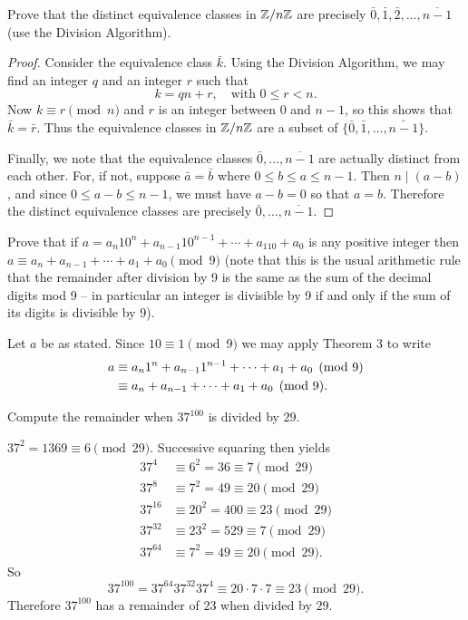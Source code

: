  Prove that the distinct equivalence classes in $\mathbb{Z}/n\mathbb{Z}$ are
precisely $\bar{0}, \bar{1}, \bar{2}, \ldots, \overline{n - 1}$ (use
the Division Algorithm).
\begin{proof}
  Consider the equivalence class $\bar k$. Using the Division
  Algorithm, we may find an integer $q$ and an integer $r$ such that
  \begin{equation*}
    k = qn + r,\quad\text{with $0\leq r<n$.}
  \end{equation*}
  Now $k\equiv r\pmod n$ and $r$ is an integer between $0$ and
  $n - 1$, so this shows that $\bar k = \bar r$. Thus the equivalence
  classes in $\mathbb{Z}/n\mathbb{Z}$ are a subset of
  $\{\bar{0}, \bar{1}, \ldots, \bar{n-1}\}$.

  Finally, we note that the equivalence classes
  $\bar0, \ldots, \overline{n-1}$ are actually distinct from each
  other. For, if not, suppose $\bar a = \bar b$ where
  $0\leq b\leq a\leq n-1$. Then $n\mid(a - b)$, and since
  $0\leq a-b\leq n-1$, we must have $a-b = 0$ so that $a =
  b$. Therefore the distinct equivalence classes are precisely
  $\bar0,\ldots,\overline{n-1}$.
\end{proof}

 Prove that if
$a = a_n10^n + a_{n-1}10^{n-1} + \cdots + a_110 + a_0$ is any positive
integer then $a\equiv a_n + a_{n-1} + \cdots + a_1 + a_0\pmod9$ (note
that this is the usual arithmetic rule that the remainder after
division by 9 is the same as the sum of the decimal digits mod 9 -- in
particular an integer is divisible by 9 if and only if the sum of its
digits is divisible by 9).
\begin{solution}
  Let $a$ be as stated. Since $10\equiv1\pmod9$ we may apply Theorem 3
  to write
  \begin{align*}
    a &\equiv a_n1^n + a_{n-1}1^{n-1} + \cdots + a_1 + a_0\pmod9 \\
      &\equiv a_n + a_{n-1} + \cdots + a_1 + a_0\pmod9. \qedhere
  \end{align*}
\end{solution}

 Compute the remainder when $37^{100}$ is divided by $29$.
\begin{solution}
  $37^2 = 1369\equiv6\pmod{29}$. Successive squaring then yields
  \begin{align*}
    37^4 &\equiv 6^2 = 36 \equiv 7\pmod{29} \\
    37^8 &\equiv 7^2 = 49 \equiv 20\pmod{29} \\
    37^{16} &\equiv 20^2 = 400 \equiv 23\pmod{29} \\
    37^{32} &\equiv 23^2 = 529 \equiv 7\pmod{29} \\
    37^{64} &\equiv 7^2 = 49 \equiv 20\pmod{29}.
  \end{align*}
  So
  \begin{equation*}
    37^{100} = 37^{64}37^{32}37^4 \equiv 20\cdot7\cdot7 \equiv 23\pmod{29}.
  \end{equation*}
  Therefore $37^{100}$ has a
  remainder of $23$ when divided by $29$.
\end{solution}

